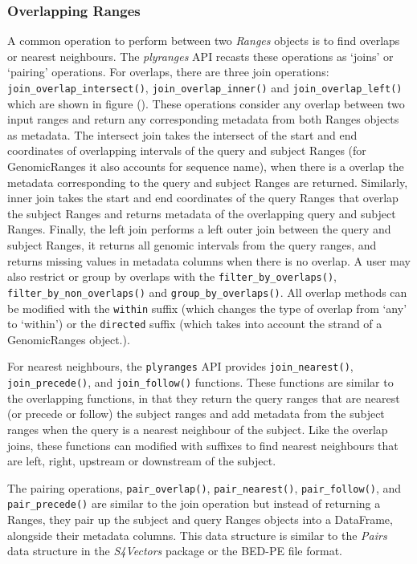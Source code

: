 \documentclass[10pt,letterpaper]{article}
\begin{document}
\hypertarget{overlapping-ranges}{%
\subsubsection{Overlapping Ranges}\label{overlapping-ranges}}

A common operation to perform between two \emph{Ranges} objects is to
find overlaps or nearest neighbours. The \emph{plyranges} API recasts
these operations as `joins' or `pairing' operations. For overlaps, there
are three join operations: \texttt{join\_overlap\_intersect()},
\texttt{join\_overlap\_inner()} and \texttt{join\_overlap\_left()} which
are shown in figure (). These operations consider any overlap between
two input ranges and return any corresponding metadata from both Ranges
objects as metadata. The intersect join takes the intersect of the start
and end coordinates of overlapping intervals of the query and subject
Ranges (for GenomicRanges it also accounts for sequence name), when
there is a overlap the metadata corresponding to the query and subject
Ranges are returned. Similarly, inner join takes the start and end
coordinates of the query Ranges that overlap the subject Ranges and
returns metadata of the overlapping query and subject Ranges. Finally,
the left join performs a left outer join between the query and subject
Ranges, it returns all genomic intervals from the query ranges, and
returns missing values in metadata columns when there is no overlap. A
user may also restrict or group by overlaps with the
\texttt{filter\_by\_overlaps()}, \texttt{filter\_by\_non\_overlaps()}
and \texttt{group\_by\_overlaps()}. All overlap methods can be modified
with the \texttt{within} suffix (which changes the type of overlap from
`any' to `within') or the \texttt{directed} suffix (which takes into
account the strand of a GenomicRanges object.).

For nearest neighbours, the \texttt{plyranges} API provides
\texttt{join\_nearest()}, \texttt{join\_precede()}, and
\texttt{join\_follow()} functions. These functions are similar to the
overlapping functions, in that they return the query ranges that are
nearest (or precede or follow) the subject ranges and add metadata from
the subject ranges when the query is a nearest neighbour of the subject.
Like the overlap joins, these functions can modified with suffixes to
find nearest neighbours that are left, right, upstream or downstream of
the subject.

The pairing operations, \texttt{pair\_overlap()},
\texttt{pair\_nearest()}, \texttt{pair\_follow()}, and
\texttt{pair\_precede()} are similar to the join operation but instead
of returning a Ranges, they pair up the subject and query Ranges objects
into a DataFrame, alongside their metadata columns. This data structure
is similar to the \emph{Pairs} data structure in the \emph{S4Vectors}
package or the BED-PE file format.
\end{document}
